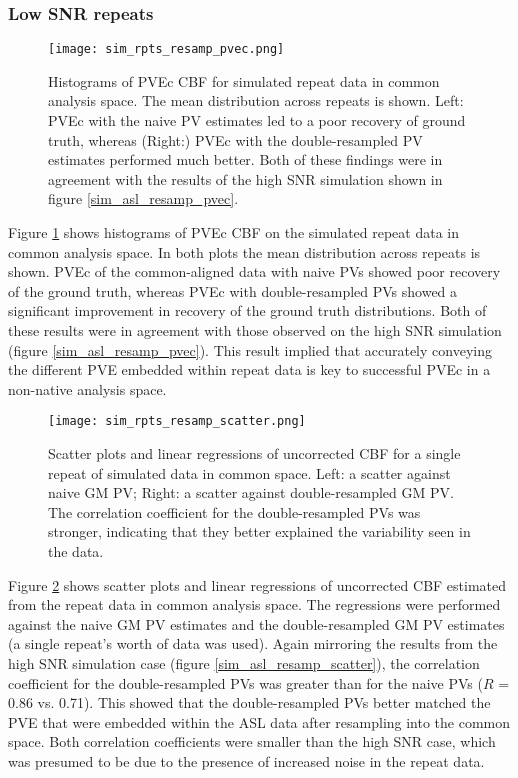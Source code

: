 \subsubsection{Low SNR repeats}

\begin{figure}[H]
\centering
\texttt{[image: sim\_rpts\_resamp\_pvec.png]}
\caption{Histograms of PVEc CBF for simulated repeat data in common analysis space. The mean distribution across repeats is shown. Left: PVEc with the naive PV estimates led to a poor recovery of ground truth, whereas (Right:) PVEc with the double-resampled PV estimates performed much better. Both of these findings were in agreement with the results of the high SNR simulation shown in figure \ref{sim_asl_resamp_pvec}.}
\label{sim_rpts_resamp_pvec}
\end{figure}

Figure \ref{sim_rpts_resamp_pvec} shows histograms of PVEc CBF on the simulated repeat data in common analysis space. In both plots the mean distribution across repeats is shown. PVEc of the common-aligned data with naive PVs showed poor recovery of the ground truth, whereas PVEc with double-resampled PVs showed a significant improvement in recovery of the ground truth distributions. Both of these results were in agreement with those observed on the high SNR simulation (figure \ref{sim_asl_resamp_pvec}). This result implied that accurately conveying the different PVE embedded within repeat data is key to successful PVEc in a non-native analysis space.  

\begin{figure}[H]
\centering
\texttt{[image: sim\_rpts\_resamp\_scatter.png]}
\caption{Scatter plots and linear regressions of uncorrected CBF for a single repeat of simulated data in common space. Left: a scatter against naive GM PV; Right: a scatter against double-resampled GM PV. The correlation coefficient for the double-resampled PVs was stronger, indicating that they better explained the variability seen in the data.}
\label{sim_rpts_resamp_scatter}
\end{figure}

Figure \ref{sim_rpts_resamp_scatter} shows scatter plots and linear regressions of uncorrected CBF estimated from the repeat data in common analysis space. The regressions were performed against the naive GM PV estimates and the double-resampled GM PV estimates (a single repeat's worth of data was used). Again mirroring the results from the high SNR simulation case (figure \ref{sim_asl_resamp_scatter}), the correlation coefficient for the double-resampled PVs was greater than for the naive PVs ($R$ = 0.86 vs. 0.71). This showed that the double-resampled PVs better matched the PVE that were embedded within the ASL data after resampling into the common space. Both correlation coefficients were smaller than the high SNR case, which was presumed to be due to the presence of increased noise in the repeat data. 


